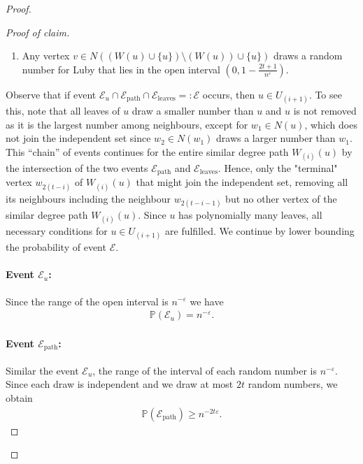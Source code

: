 \documentclass[10pt,a4paper]{amsart}
\newcommand{\Pro}[1]{\mathbb{P}\left(#1\right)}
\newcommand{\eps}{\varepsilon}
\begin{document}
\begin{proof}
{\begin{proof}[Proof of claim]
\begin{enumerate}
\item[($\mathcal{E}_{\text{leaves}}$)] Any vertex $v \in N((W(u) \cup \{u\}) \setminus (W(u)) \cup \{u\})$  draws a random number for Luby that lies in the open interval $(0, 1- \frac{2t + 1}{n^\eps})$.   
\end{enumerate}
%
Observe that if event $\mathcal{E}_u \cap \mathcal{E}_{\text{path}} \cap \mathcal{E}_{\text{leaves}} =: \mathcal{E}$ occurs, then $u \in U_{(i+1)}$. To see this, note that all leaves of $u$ draw a smaller number than $u$ and $u$ is not removed as it is the largest number among neighbours, except for $w_1 \in N(u)$, which does not join the independent set since $w_2 \in N(w_1)$ draws a larger number than $w_1$. This ``chain'' of events continues for the entire similar degree path $W_{(i)}(u)$ by the intersection of the two events $\mathcal{E}_{\text{path}}$ and $\mathcal{E}_{\text{leaves}}$. Hence, only the "terminal" vertex $w_{2(t-i)}$ of $W_{(i)}(u)$ that might join the independent set, removing all its neighbours including the neighbour $w_{2(t-i-1)}$ but no other vertex of the similar degree path $W_{(i)}(u)$. Since $u$ has polynomially many leaves, all necessary conditions for $u \in U_{(i+1)}$ are fulfilled. We continue by lower bounding the probability of event $\mathcal{E}$.

\paragraph{Event $\mathcal{E}_u$:} Since the range of the open interval is $n^{-\eps}$ we have
%
\begin{align}\label{eq:randomdraw1}
    \Pro{\mathcal{E}_u} = n^{-\eps}.
\end{align}
%
\paragraph{Event $\mathcal{E}_{\text{path}}$:} Similar the event $\mathcal{E}_u$, the range of the interval of each random number is $n^{-\eps}$. Since each draw is independent and we draw at most $2t$ random numbers, we obtain
%
\begin{align}\label{eq:randomdraw2}
    \Pro{\mathcal{E}_{\text{path}}} \geq n^{-2t\eps}.
\end{align}
%

\end{proof}}
\end{proof}
\end{document}
